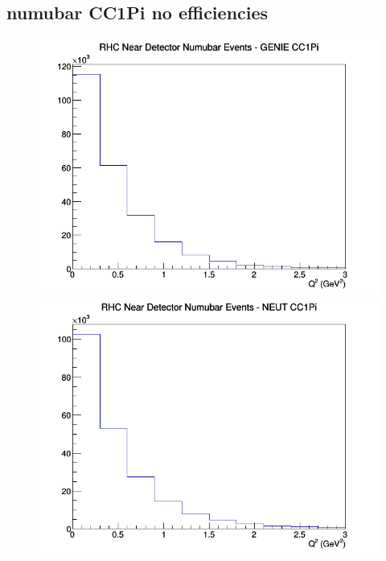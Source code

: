 \subsection{numubar CC1Pi no efficiencies}
\begin{figure}[h]
\includegraphics[width=\linewidth]{Q2/nominal/CC1Pi_RHC_ND_numubar_Q2_GENIE.png}
\endminipage
{}
\includegraphics[width=\linewidth]{Q2/nominal/CC1Pi_RHC_ND_numubar_Q2_NEUT.png}
\endminipage
{}

\end{figure}
